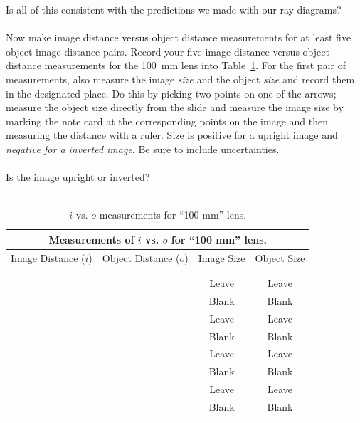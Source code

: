 \vspace*{1.5cm}
\noindent
Is all of this consistent with the predictions we made with our ray diagrams? \\
\vspace*{2cm} \\
\newpage
Now make image distance versus object distance measurements for at least five
object-image distance pairs. 
Record your five image distance versus object distance measurements for the
100~mm lens into Table~\ref{tab:OP:136}. For the first pair of measurements,
also measure the image {\it size} and the object {\it size} and record them in
the designated place. Do this by picking two points on one of the arrows;
measure the object size directly from the slide and measure the image size by
marking the note card at the corresponding points on the image and then
measuring the distance with a ruler. Size is positive for a upright image and {\it negative for a inverted image}.
Be sure to include uncertainties. \\
\ \\
\noindent Is the image upright or inverted? \\
\ \\
\begin{table}[t]
\begin{center}
\begin{tabular}{|c|c|c|c|}
\hline
\multicolumn{4}{|c|}{Measurements of $i$ vs. $o$ for ``100 mm'' lens.} \\
\hline
Image Distance ($i$) & Object Distance ($o$) & Image Size & Object Size \\
\hline
\hspace*{3cm} & \hspace*{3cm} & \hspace*{3cm} & \hspace*{3cm} \\
& & &  \\
\hline
& & Leave & Leave  \\
& & Blank& Blank \\
\hline
& & Leave & Leave \\
& & Blank & Blank\\
\hline
& & Leave & Leave \\
& & Blank & Blank \\
\hline
& & Leave & Leave \\
& & Blank & Blank \\
\hline
\end{tabular}
\end{center}
\caption{$i$ vs. $o$ measurements for ``100 mm'' lens.}
\label {tab:OP:136}
\end{table}

